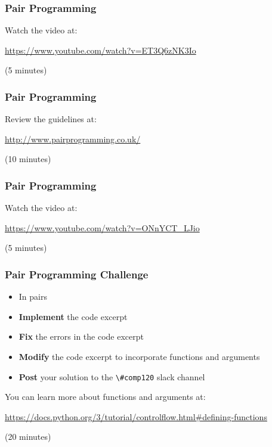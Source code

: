 \begin{frame}
	\frametitle{Pair Programming}
	
	Watch the video at:
	
	\vspace{1.5em}
		
	\url{https://www.youtube.com/watch?v=ET3Q6zNK3Io}
	
	\vspace{1em}
		
	(5 minutes)
	
\end{frame}

\begin{frame}
	\frametitle{Pair Programming}
	
	Review the guidelines at:
	
	\vspace{1.5em}
		
	\url{http://www.pairprogramming.co.uk/}
	
	\vspace{1em}
		
	(10 minutes)
	
\end{frame}

\begin{frame}
	\frametitle{Pair Programming}
	
	Watch the video at:
	
	\vspace{1.5em}
		
	\url{https://www.youtube.com/watch?v=ONnYCT_LJio}
	
	\vspace{1em}
		
	(5 minutes)
	
\end{frame}

\begin{frame}
	\frametitle{Pair Programming Challenge}
	
	\begin{itemize}
		\item In pairs
		\item \textbf{Implement} the code excerpt
		\item \textbf{Fix} the errors in the code excerpt
		\item \textbf{Modify} the code excerpt to incorporate functions and arguments
		\item \textbf{Post} your solution to the \lstinline{\#comp120} slack channel
	\end{itemize}
	
	You can learn more about functions and arguments at:
	
	\vspace{1em}
	
	 \url{https://docs.python.org/3/tutorial/controlflow.html\#defining-functions}
	
	\vspace{1em}
	
	(20 minutes)
	
\end{frame}

